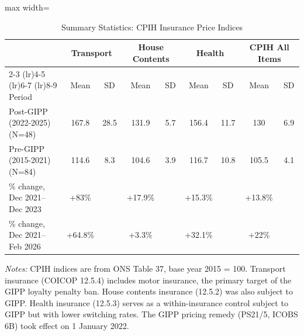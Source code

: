 \begin{table}[H]
\centering
\caption{Summary Statistics: CPIH Insurance Price Indices}
\label{tab:summary}
\begin{threeparttable}
\footnotesize
\begin{adjustbox}{max width=\textwidth}
\begin{tabular}{lcccccccc}
\toprule
 & \multicolumn{2}{c}{Transport} & \multicolumn{2}{c}{House Contents} & \multicolumn{2}{c}{Health} & \multicolumn{2}{c}{CPIH All Items} \\
\cmidrule(lr){2-3} \cmidrule(lr){4-5} \cmidrule(lr){6-7} \cmidrule(lr){8-9}
Period & Mean & SD & Mean & SD & Mean & SD & Mean & SD \\
\midrule
Post-GIPP (2022-2025) (N=48) & 167.8 & 28.5 & 131.9 & 5.7 & 156.4 & 11.7 & 130 & 6.9 \\
Pre-GIPP (2015-2021) (N=84) & 114.6 & 8.3 & 104.6 & 3.9 & 116.7 & 10.8 & 105.5 & 4.1 \\
\midrule
\% change, Dec 2021--Dec 2023 & +83\% & & +17.9\% & & +15.3\% & & +13.8\% & \\
\% change, Dec 2021--Feb 2026 & +64.8\% & & +3.3\% & & +32.1\% & & +22\% & \\
\bottomrule
\end{tabular}
\end{adjustbox}
\begin{tablenotes}[flushleft]
\small
\item \textit{Notes:} CPIH indices are from ONS Table 37, base year 2015 = 100. Transport insurance (COICOP 12.5.4) includes motor insurance, the primary target of the GIPP loyalty penalty ban. House contents insurance (12.5.2) was also subject to GIPP. Health insurance (12.5.3) serves as a within-insurance control subject to GIPP but with lower switching rates. The GIPP pricing remedy (PS21/5, ICOBS 6B) took effect on 1 January 2022.
\end{tablenotes}
\end{threeparttable}
\end{table}
